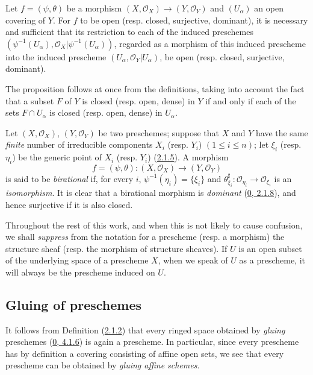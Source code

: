 \begin{proposition}[2.2.8]
\label{I.2.2.8}
Let $f=(\psi,\theta)$ be a morphism
$(X,\mathscr{O}_X)\to(Y,\mathscr{O}_Y)$ and $(U_\alpha)$ an open covering
of $Y$. For $f$ to be open (resp. closed, surjective, dominant), it is
necessary and sufficient that its restriction to each of the induced
preschemes $(\psi^{-1}(U_\alpha),\mathscr{O}_X|\psi^{-1}(U_\alpha))$,
regarded as a morphism of this induced prescheme into the induced prescheme
$(U_\alpha,\mathscr{O}_Y|U_\alpha)$, be open (resp. closed, surjective,
dominant).
\end{proposition}

The proposition follows at once from the definitions, taking into account
the fact that a subset $F$ of $Y$ is closed (resp. open, dense) in $Y$ if
and only if each of the sets $F\cap U_\alpha$ is closed (resp. open, dense)
in $U_\alpha$.

\begin{env}[2.2.9]
\label{I.2.2.9}
Let $(X,\mathscr{O}_X)$, $(Y,\mathscr{O}_Y)$ be two preschemes; suppose
that $X$ and $Y$ have the same \emph{finite} number of irreducible
components $X_i$ (resp. $Y_i$) $(1\leq i\leq n)$; let $\xi_i$ (resp.
$\eta_i$) be the generic point of $X_i$ (resp. $Y_i$)
(\hyperref[I.2.1.5]{2.1.5}). A morphism
\[
  f=(\psi,\theta):(X,\mathscr{O}_X)\to(Y,\mathscr{O}_Y)
\]
is said to be \emph{birational} if, for every $i$,
$\psi^{-1}(\eta_i)=\{\xi_i\}$ and
$\theta_{\xi_i}^{\sharp}:\mathscr{O}_{\eta_i}\to\mathscr{O}_{\xi_i}$ is an
\emph{isomorphism}. It is clear that a birational morphism is
\emph{dominant} (\hyperref[0.2.1.8]{0, 2.1.8}), and hence surjective if
it is also closed.
\end{env}

\begin{notation}[2.2.10]
\label{I.2.2.10}
Throughout the rest of this work, and when this is not likely to cause
confusion, we shall \emph{suppress} from the notation for a prescheme (resp.
a morphism) the structure sheaf (resp. the morphism of structure sheaves).
If $U$ is an open subset of the underlying space of a prescheme $X$, when we
speak of $U$ as a prescheme, it will always be the prescheme induced on $U$.
\end{notation}

\subsection{Gluing of preschemes}
\label{subsection:I.2.3}

\begin{env}[2.3.1]
\label{I.2.3.1}
It follows from Definition (\hyperref[I.2.1.2]{2.1.2}) that every ringed
space obtained by \emph{gluing} preschemes
(\hyperref[0.4.1.6]{0, 4.1.6}) is again a prescheme. In particular,
since every prescheme has by definition a covering consisting of affine
open sets, we see that every prescheme can be obtained by
\emph{gluing affine schemes}.
\end{env}

